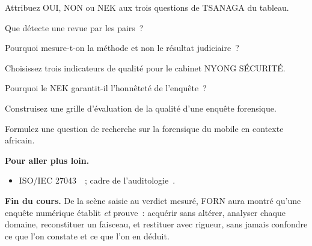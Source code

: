 \begin{boxexo}[title={\ding{45}\quad Exercice~20.4. Classer \niveaumoyen}]
Attribuez OUI, NON ou NEK aux trois questions de TSANAGA du tableau.
\end{boxexo}

\begin{boxexo}[title={\ding{45}\quad Exercice~20.5. Pairs \niveaumoyen}]
Que détecte une revue par les pairs~?
\end{boxexo}

\begin{boxexo}[title={\ding{45}\quad Exercice~20.6. Méthode ou résultat \niveaumoyen}]
Pourquoi mesure-t-on la méthode et non le résultat judiciaire~?
\end{boxexo}

\begin{boxexo}[title={\ding{45}\quad Exercice~20.7. Indicateurs \niveaumoyen}]
Choisissez trois indicateurs de qualité pour le cabinet NYONG SÉCURITÉ.
\end{boxexo}

\begin{boxexo}[title={\ding{45}\quad Exercice~20.8. NEK \niveaumoyen}]
Pourquoi le NEK garantit-il l'honnêteté de l'enquête~?
\end{boxexo}

\begin{boxexo}[title={\ding{45}\quad Exercice~20.9. Grille de qualité \niveauexpert}]
Construisez une grille d'évaluation de la qualité d'une enquête forensique.
\end{boxexo}

\begin{boxexo}[title={\ding{45}\quad Exercice~20.10. Question de recherche \niveauexpert}]
Formulez une question de recherche sur la forensique du mobile en contexte
africain.
\end{boxexo}

\bigskip

\begin{boxinfo}
\textbf{Pour aller plus loin.}
\begin{itemize}
    \item ISO/IEC 27043~\cite{iso27043}~; cadre de
          l'auditologie~\cite{minka2026auditologie}.
\end{itemize}
\end{boxinfo}

\begin{boxinfo}
\textbf{Fin du cours.} De la scène saisie au verdict mesuré, FORN aura montré
qu'une enquête numérique établit \emph{et} prouve~: acquérir sans altérer,
analyser chaque domaine, reconstituer un faisceau, et restituer avec rigueur,
sans jamais confondre ce que l'on constate et ce que l'on en déduit.
\end{boxinfo}
